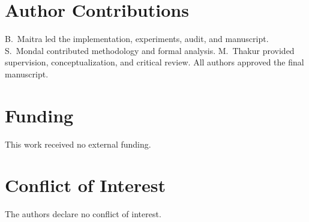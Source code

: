 \documentclass[journal]{IEEEtran}
\begin{document}
\section*{Author Contributions}
B.~Maitra led the implementation, experiments, audit, and manuscript. S.~Mondal contributed methodology and formal analysis. M.~Thakur provided supervision, conceptualization, and critical review. All authors approved the final manuscript.

\section*{Funding}
This work received no external funding.

\section*{Conflict of Interest}
The authors declare no conflict of interest.
\end{document}
